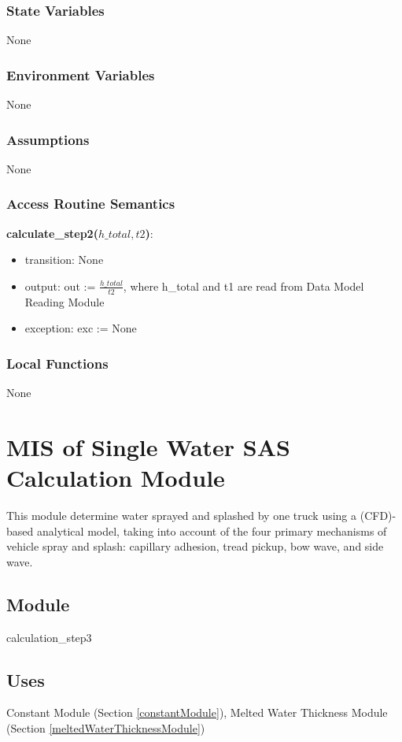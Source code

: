 \documentclass[12pt, titlepage]{article}
\begin{document}
\subsubsection{State Variables}
None
\subsubsection{Environment Variables}
None
\subsubsection{Assumptions}
None
\subsubsection{Access Routine Semantics}

\noindent \textbf{calculate\_step2($h\_total, t2$)}:
\begin{itemize}
\item transition: None
\item output: out := $\frac{h\_total}{t2}$, where h\_total and t1 are read from Data Model Reading Module
\item exception: exc := None
\end{itemize}
\subsubsection{Local Functions}
None
\newpage

\section{MIS of Single Water SAS Calculation Module} \label{singleWaterSASCalculationModule}
This module determine water sprayed and splashed by one truck using a  (CFD)-based analytical model, taking into account of the four primary mechanisms of vehicle spray and splash: capillary adhesion, tread pickup, bow wave, and side wave.

\subsection{Module}
calculation\_step3

\subsection{Uses}

Constant Module (Section \ref{constantModule}), Melted Water Thickness Module (Section \ref{meltedWaterThicknessModule})
\end{document}
